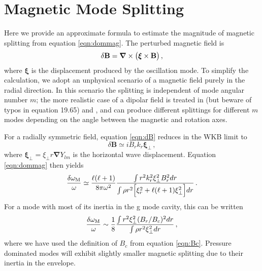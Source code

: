 
\section{Magnetic Mode Splitting}
\label{magmode}

Here we provide an approximate formula to estimate the magnitude of magnetic splitting from equation \ref{eqn:dommag}. The perturbed magnetic field is
\begin{equation}
\label{eqn:dB}
\delta {\bf B} = {\boldsymbol \nabla} \times \big( {\boldsymbol \xi} \times {\bf B} \big) \, ,
\end{equation}
where ${\boldsymbol \xi}$ is the displacement produced by the oscillation mode. To simplify the calculation, we adopt an unphysical scenario of a magnetic field purely in the radial direction. In this scenario the splitting is independent of mode angular number $m$; the more realistic case of a dipolar field is treated in \cite{Unno_1989} (but beware of typos in equation 19.65) and \cite{Hasan_2015}, and can produce different splittings for different $m$ modes depending on the angle between the magnetic and rotation axes.

For a radially symmetric field, equation \ref{eqn:dB} reduces in the WKB limit to 
\begin{equation}
\delta {\boldsymbol B} \simeq i B_r k_r \boldsymbol{\xi}_\perp \, ,
\end{equation}
where $\boldsymbol{\xi}_\perp = \xi_\perp r \boldsymbol{\nabla} Y_{lm}$ is the horizontal wave displacement. Equation \ref{eqn:dommag} then yields
\begin{equation}
\label{eqn:dommag2}
\frac{\delta \omega_{\rm M}}{\omega} \simeq \frac{\ell(\ell+1)}{8 \pi \omega^2 } \frac{\int r^2 k_r^2 \xi_\perp^2 B_r^2 d r }{\int  \rho r^2 \Big[ \xi_r^2 + \ell(\ell+1) \xi_\perp^2 \Big] d r }\, .
\end{equation}
For a mode with most of its inertia in the g mode cavity, this can be written 
\begin{equation}
\label{eqn:dommag3}
\frac{\delta \omega_{\rm M}}{\omega} \sim \frac{1}{8} \frac{\int r^2 \xi_\perp^2 (B_r/B_c)^2 d r }{\int \rho r^2 \xi_\perp^2 d r }\, ,
\end{equation}
where we have used the definition of $B_c$ from equation \ref{eqn:Bc}. Pressure dominated modes will exhibit slightly smaller magnetic splitting due to their inertia in the envelope.

